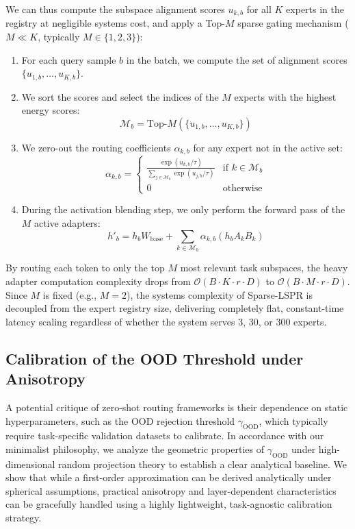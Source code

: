 We can thus compute the subspace alignment scores $u_{k, b}$ for all $K$ experts in the registry at negligible systems cost, and apply a Top-$M$ sparse gating mechanism ($M \ll K$, typically $M \in \{1, 2, 3\}$):
\begin{enumerate}
    \item For each query sample $b$ in the batch, we compute the set of alignment scores $\{u_{1, b}, \dots, u_{K, b}\}$.
    \item We sort the scores and select the indices of the $M$ experts with the highest energy scores:
    \begin{equation}
        \mathcal{M}_b = \text{Top-}M \left( \{u_{1, b}, \dots, u_{K, b}\} \right)
    \end{equation}
    \item We zero-out the routing coefficients $\alpha_{k, b}$ for any expert not in the active set:
    \begin{equation}
        \alpha_{k, b} = \begin{cases}
            \frac{\exp(u_{k, b} / \tau)}{\sum_{j \in \mathcal{M}_b} \exp(u_{j, b} / \tau)} & \text{if } k \in \mathcal{M}_b \\
            0 & \text{otherwise}
        \end{cases}
    \end{equation}
    \item During the activation blending step, we only perform the forward pass of the $M$ active adapters:
    \begin{equation}
        h'_b = h_b W_{\text{base}} + \sum_{k \in \mathcal{M}_b} \alpha_{k, b} \left( h_b A_k B_k \right)
    \end{equation}
\end{enumerate}
By routing each token to only the top $M$ most relevant task subspaces, the heavy adapter computation complexity drops from $\mathcal{O}(B \cdot K \cdot r \cdot D)$ to $\mathcal{O}(B \cdot M \cdot r \cdot D)$. Since $M$ is fixed (e.g., $M=2$), the systems complexity of Sparse-LSPR is decoupled from the expert registry size, delivering completely flat, constant-time latency scaling regardless of whether the system serves 3, 30, or 300 experts.

\subsection{Calibration of the OOD Threshold under Anisotropy}
\label{subsec:method_calibration}

A potential critique of zero-shot routing frameworks is their dependence on static hyperparameters, such as the OOD rejection threshold $\gamma_{\text{OOD}}$, which typically require task-specific validation datasets to calibrate. In accordance with our minimalist philosophy, we analyze the geometric properties of $\gamma_{\text{OOD}}$ under high-dimensional random projection theory to establish a clear analytical baseline. We show that while a first-order approximation can be derived analytically under spherical assumptions, practical anisotropy and layer-dependent characteristics can be gracefully handled using a highly lightweight, task-agnostic calibration strategy.

